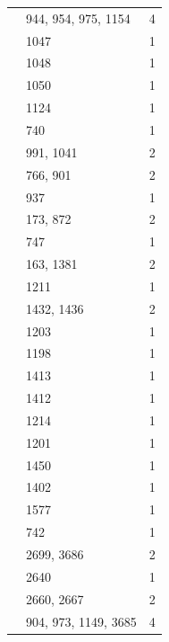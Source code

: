 \begin{longtable}{@{}p{}p{}p{}@{}}
\cite[Proposition~5.4]{FengMalle2022} & 944, 954, 975, 1154 & 4 \\
\cite[Proposition~5.5]{FengMalle2022} & 1047 & 1 \\
\cite[Proposition~5.9]{FengMalle2022} & 1048 & 1 \\
\cite[Proposition~6.1 and the proof of Theorem~6.2]{FengMalle2022} & 1050 & 1 \\
\cite[Remark~3.5]{FengMalle2022} & 1124 & 1 \\
\cite[Sections~2 and~5]{FengMalle2022} & 740 & 1 \\
\cite[Section~4.1]{FengMalle2022} & 991, 1041 & 2 \\
\cite[Section~5]{FengMalle2022} & 766, 901 & 2 \\
\cite[Section~5.1]{FengMalle2022} & 937 & 1 \\
\cite[Theorem~1]{FengMalle2022} & 173, 872 & 2 \\
\cite[p.~11]{FengMalle2022} & 747 & 1 \\
\cite{FengMalleZhang2026} & 163, 1381 & 2 \\
\cite[Condition~3.23]{FengMalleZhang2026} & 1211 & 1 \\
\cite[Condition~6.1]{FengMalleZhang2026} & 1432, 1436 & 2 \\
\cite[Definitions~3.17--3.18]{FengMalleZhang2026} & 1203 & 1 \\
\cite[Definition~3.5]{FengMalleZhang2026} & 1198 & 1 \\
\cite[Lemma~3.21]{FengMalleZhang2026} & 1413 & 1 \\
\cite[Proposition~3.20]{FengMalleZhang2026} & 1412 & 1 \\
\cite[Proposition~3.24(b)]{FengMalleZhang2026} & 1214 & 1 \\
\cite[Section~3.2]{FengMalleZhang2026} & 1201 & 1 \\
\cite[Theorem~6.2]{FengMalleZhang2026} & 1450 & 1 \\
\cite[Theorem~7.5]{FengMalleZhang2026} & 1402 & 1 \\
\cite[Proposition~7.3]{FengSpath2023} & 1577 & 1 \\
\cite{FengYuZhang2024} & 742 & 1 \\
\cite[Corollary~2.22(2)]{FengYuZhang2024} & 2699, 3686 & 2 \\
\cite[Corollary~5.15]{FengYuZhang2024} & 2640 & 1 \\
\cite[Corollary~5.17]{FengYuZhang2024} & 2660, 2667 & 2 \\
\cite[Lemma~2.3]{FengYuZhang2024} & 904, 973, 1149, 3685 & 4 \\

\end{longtable}
